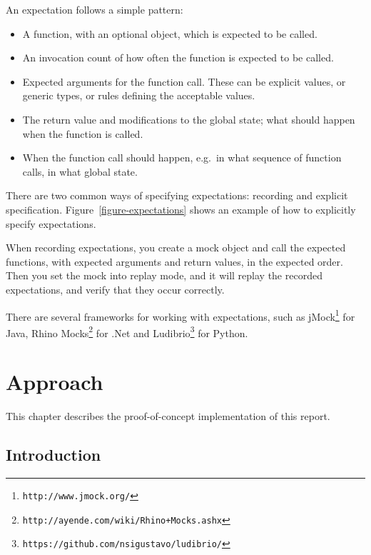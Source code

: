 \documentclass[a4paper,11pt]{kth-mag}
\begin{document}
An expectation follows a simple pattern:

\begin{itemize}
	\item A function, with an optional object, which is expected to be called.
	\item An invocation count of how often the function is expected to be called.
	\item Expected arguments for the function call. These can be explicit values,
		or generic types, or rules defining the acceptable values.
	\item The return value and modifications to the global state; what should
		happen when the function is called.
	\item When the function call should happen, e.g.\ in what sequence of
		function calls, in what global state.
\end{itemize}

There are two common ways of specifying expectations: recording and explicit
specification. Figure~\ref{figure-expectations} shows an example of how to
explicitly specify expectations.

When recording expectations, you create a mock object and call the expected
functions, with expected arguments and return values, in the expected order.
Then you set the mock into replay mode, and it will replay the recorded
expectations, and verify that they occur correctly.

There are several frameworks for working with expectations, such as
jMock\footnote{\texttt{http://www.jmock.org/}} for Java, Rhino
Mocks\footnote{\texttt{http://ayende.com/wiki/Rhino+Mocks.ashx}} for .Net and
Ludibrio\footnote{\texttt{https://github.com/nsigustavo/ludibrio/}} for Python.







\pagestyle{newchap}
\chapter{Approach} \label{chapter-approach}

This chapter describes the proof-of-concept implementation of this report.


\section{Introduction}
\end{document}
